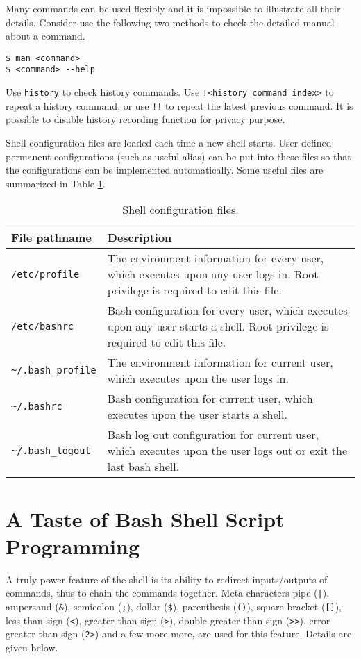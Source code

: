 Many commands can be used flexibly and it is impossible to illustrate all their details. Consider use the following two methods to check the detailed manual about a command.
\begin{lstlisting}
$ man <command>
$ <command> --help
\end{lstlisting}

Use \verb|history| to check history commands. Use \verb|!<history command index>| to repeat a history command, or use \verb|!!| to repeat the latest previous command. It is possible to disable history recording function for privacy purpose.

Shell configuration files are loaded each time a new shell starts. User-defined permanent configurations (such as useful alias) can be put into these files so that the configurations can be implemented automatically. Some useful files are summarized in Table \ref{ch:sb:tab:shellconfig}.

\begin{table}
	\centering \caption{Shell configuration files.}\label{ch:sb:tab:shellconfig}
	\begin{tabularx}{\textwidth}{lX}
		\hline
		File pathname & Description \\ \hline
		\verb|/etc/profile| & The environment information for every user, which executes upon any user logs in. Root privilege is required to edit this file.  \\ 
		\verb|/etc/bashrc| & Bash configuration for every user, which executes upon any user starts a shell. Root privilege is required to edit this file. \\ 
		\verb|~/.bash_profile| & The environment information for current user, which executes upon the user logs in. \\ 
		\verb|~/.bashrc| & Bash configuration for current user, which executes upon the user starts a shell. \\ 
		\verb|~/.bash_logout| & Bash log out configuration for current user, which executes upon the user logs out or exit the last bash shell. \\ \hline
	\end{tabularx}
\end{table}

\section{A Taste of Bash Shell Script Programming}

A truly power feature of the shell is its ability to redirect inputs/outputs of commands, thus to chain the commands together. Meta-characters pipe (\verb?|?), ampersand (\verb|&|), semicolon (\verb|;|), dollar (\verb|$|), parenthesis (\verb|()|), square bracket (\verb|[]|), less than sign (\verb|<|), greater than sign (\verb|>|), double greater than sign (\verb|>>|), error greater than sign (\verb|2>|) and a few more more, are used for this feature. Details are given below.


